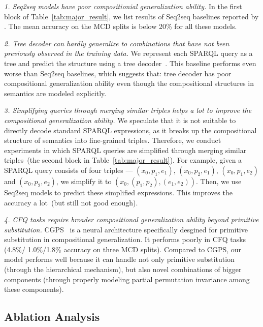\documentclass{article}
\begin{document}
\emph{1. Seq2seq models have poor compositionial generalization ability.} In the first block of Table~\ref{tab:major_result}, we list results of Seq2seq baselines reported by \citet{keysers2020measuring}. The mean accuracy on the MCD splits is below 20\% for all these models.


\emph{2. Tree decoder can hardly generalize to combinations that have not been previously observed in the training data.} We represent each SPARQL query as a tree and predict the structure using a tree decoder~\citep{dong-lapata-2016-language}. This baseline performs even worse than Seq2seq baselines, which suggests that: tree decoder has poor compositional generalization ability even though the compositional structures in semantics are modeled explicitly.

\emph{3. Simplifying queries through merging similar triples helps a lot to improve the compositional generalization ability.}
We speculate that it is not suitable to directly decode standard SPARQL expressions, as it breaks up the compositional structure of semantics into fine-grained triples.
Therefore, we conduct experiments in which SPARQL queries are simplified through merging similar triples~(the second block in Table~\ref{tab:major_result}).
For example, given a SPARQL query consists of four triples --- $(x_0, p_1, e_1)$, $(x_0, p_2, e_1)$, $(x_0, p_1, e_2)$ and $(x_0, p_2, e_2)$, we simplify it to $(x_0, (p_1, p_2), (e_1, e_2))$.
Then, we use Seq2seq models to predict these simplified expressions.
This improves the accuracy a lot~(but still not good enough).

\emph{4. CFQ tasks require broader compositional generalization ability beyond primitive substitution.}
CGPS~\citep{li2019compositional} is a neural architecture specifically desgined for primitive substitution in compositional generalization.
It performs poorly in CFQ tasks (4.8\%/ 1.0\%/1.8\% accuracy on three MCD splits).
Compared to CGPS, our model performs well because it can handle not only primitive substitution (through the hierarchical mechanism), but also novel combinations of bigger components (through properly modeling partial permutation invariance among these components).









\subsection{Ablation Analysis}
\end{document}
